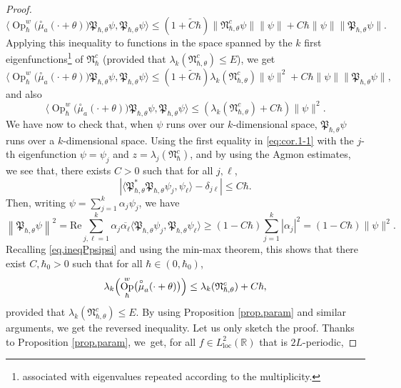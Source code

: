\documentclass[10pt]{amsart}
\newcommand{\loc}{\mathrm{loc}}
\DeclareMathOperator{\Op}{Op}
\theoremstyle{plain}
\theoremstyle{definition}
\renewcommand{\Re}{\mathrm{Re}}
\begin{document}
\begin{proof}
\[
\langle\Op^w_\hbar\bigl(\overset{\circ}{\mu}_a(\cdot+\theta)\bigr)\mathfrak{P}_{\hbar,\theta}\psi,\mathfrak{P}_{\hbar,\theta}\psi\rangle\leq(1+\tilde C\hbar) \|\mathfrak{N}^c_{\hbar,\theta}\psi\| \|\psi\|+C\hbar\|\psi\|\|\mathfrak{P}_{\hbar,\theta}\psi\|.
\]
Applying this inequality to functions in the space spanned by the $k$ first eigenfunctions\footnote{associated with eigenvalues repeated according to the multiplicity.} of $\mathfrak{N}_\hbar^c$ (provided that $\lambda_k(\mathfrak{N}^c_{\hbar,\theta})\leq E$), we get
\[
\langle \Op^w_\hbar\bigl(\overset{\circ}{\mu}_a(\cdot+\theta)\bigr)\mathfrak{P}_{\hbar,\theta}\psi,\mathfrak{P}_{\hbar,\theta}\psi\rangle\leq (1+\tilde C\hbar) \lambda_k(\mathfrak{N}^c_{\hbar,\theta})\|\psi\|^2+ C\hbar\|\psi\|\|\mathfrak{P}_{\hbar,\theta}\psi\|,
\]
and also
\begin{equation}\label{eq.ineqPpsipsi}
\langle\Op^w_\hbar\bigl(\overset{\circ}{\mu}_a(\cdot+\theta)\bigr)\mathfrak{P}_{\hbar,\theta}\psi,\mathfrak{P}_{\hbar,\theta}\psi\rangle\leq (\lambda_k(\mathfrak{N}^c_{\hbar,\theta})+C\hbar)\|\psi\|^2.
\end{equation}
We have now to check that, when $\psi$ runs over our $k$-dimensional space, $\mathfrak{P}_{\hbar,\theta}\psi$ runs over a $k$-dimensional space. Using the first equality in \eqref{eq:cor.1-1} with the $j$-th eigenfunction $\psi=\psi_j$ and $z=\lambda_j(\mathfrak{N}_\hbar^c)$, and by using the Agmon estimates, we see that, there exists $C>0$ such that for all $j, \ell$,
\[
\left|\langle \mathfrak{P}^*_{\hbar,\theta}\mathfrak{P}_{\hbar,\theta}\psi_j,\psi_\ell\rangle-\delta_{j\ell}\right|\leq C\hbar.
\]
Then, writing $\psi=\sum_{j=1}^k\alpha_j\psi_j$, we have
\begin{equation}\label{eq.Ppsipsi}
\left\|\mathfrak{P}_{\hbar,\theta}\psi\right\|^2=\Re\sum_{j,\ell=1}^k\alpha_j\overline{\alpha_\ell}\langle\mathfrak{P}_{\hbar,\theta}\psi_j,\mathfrak{P}_{\hbar,\theta}\psi_\ell\rangle\geq (1-C\hbar)\sum_{j=1}^k|\alpha_j|^2=(1-C\hbar)\|\psi\|^2.
\end{equation}
Recalling \eqref{eq.ineqPpsipsi} and using the min-max theorem, this shows that there exist $C,\hbar_0>0$ such that for all $\hbar\in(0,\hbar_0)$,
\[
\lambda_k\Bigl(\Op^w_\hbar\bigl(\overset{\circ}{\mu}_a(\cdot+\theta)\bigr)\Bigr)\leq \lambda_k(\mathfrak{N}^c_{\hbar,\theta})+C\hbar,
\]
provided that $\lambda_k(\mathfrak{N}^c_{\hbar,\theta})\leq E$. By using Proposition \ref{prop.param} and similar arguments, we get the reversed inequality. Let us only sketch the proof. Thanks to Proposition \ref{prop.param}, we~get, for all $f\in L^2_{\loc}(\mathbb{R})$ that is $2L$-periodic,

\end{proof}
\end{document}
